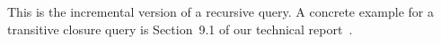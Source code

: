 \noindent This is the incremental version of a recursive query.  A
concrete example for a transitive closure query is Section~9.1 of
our technical report~\cite{tr}.


%
%
%
%
%

